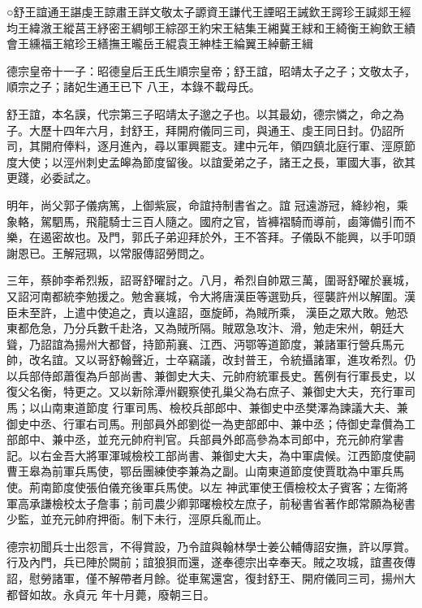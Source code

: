 
\begin{pinyinscope}

 ○舒王誼通王諶虔王諒肅王詳文敬太子謜資王謙代王諲昭王誡欽王諤珍王諴郯王經
 均王緯漵王縱莒王紓密王綢郇王綜邵王約宋王結集王緗冀王絿和王綺衡王絢欽王績會王纁福王綰珍王繕撫王曨岳王緄袁王紳桂王綸翼王綽蘄王緝



 德宗皇帝十一子：昭德皇后王氏生順宗皇帝；舒王誼，昭靖太子之子；文敬太子，順宗之子；諸妃生通王已下
 八王，本錄不載母氏。



 舒王誼，本名謨，代宗第三子昭靖太子邈之子也。以其最幼，德宗憐之，命之為子。大歷十四年六月，封舒王，拜開府儀同三司，與通王、虔王同日封。仍詔所司，其開府俸料，逐月進內，尋以軍興罷支。建中元年，領四鎮北庭行軍、涇原節度大使；以涇州刺史孟皞為節度留後。以誼愛弟之子，諸王之長，軍國大事，欲其更踐，必委試之。



 明年，尚父郭子儀病篤，上御紫宸，命誼持制書省之。誼
 冠遠游冠，絳紗袍，乘象輅，駕駟馬，飛龍騎士三百人隨之。國府之官，皆褲褶騎而導前，鹵簿備引而不樂，在遏密故也。及門，郭氏子弟迎拜於外，王不答拜。子儀臥不能興，以手叩頭謝恩已。王解冠珮，以常服傳詔勞問之。



 三年，蔡帥李希烈叛，詔哥舒曜討之。八月，希烈自帥眾三萬，圍哥舒曜於襄城，又詔河南都統李勉援之。勉舍襄城，令大將唐漢臣等選勁兵，徑襲許州以解圍。漢臣未至許，上遣中使追之，責以違詔，亟旋師，為賊所乘，
 漢臣之眾大敗。勉恐東都危急，乃分兵數千赴洛，又為賊所隔。賊眾急攻汴、滑，勉走宋州，朝廷大聳，乃詔誼為揚州大都督，持節荊襄、江西、沔鄂等道節度，兼諸軍行營兵馬元帥，改名誼。又以哥舒翰聲近，士卒竊議，改封普王，令統攝諸軍，進攻希烈。仍以兵部侍郎蕭復為戶部尚書、兼御史大夫、元帥府統軍長史。舊例有行軍長史，以復父名衡，特更之。又以新除潭州觀察使孔巢父為右庶子、兼御史大夫，充行軍司馬；以山南東道節度
 行軍司馬、檢校兵部郎中、兼御史中丞樊澤為諫議大夫、兼御史中丞、行軍右司馬。刑部員外郎劉從一為吏部郎中、兼中丞；侍御史韋儹為工部郎中、兼中丞，並充元帥府判官。兵部員外郎高參為本司郎中，充元帥府掌書記。以右金吾大將軍渾瑊檢校工部尚書、兼御史大夫，為中軍虞候。江西節度使嗣曹王皋為前軍兵馬使，鄂岳團練使李兼為之副。山南東道節度使賈耽為中軍兵馬使。荊南節度使張伯儀充後軍兵馬使。以左
 神武軍使王價檢校太子賓客；左衛將軍高承謙檢校太子詹事；前司農少卿郭曙檢校左庶子，前秘書省著作郎常願為秘書少監，並充元帥府押衙。制下未行，涇原兵亂而止。



 德宗初聞兵士出怨言，不得賞設，乃令誼與翰林學士姜公輔傳詔安撫，許以厚賞。行及內門，兵已陣於闕前；誼狼狽而還，遂奉德宗出幸奉天。賊之攻城，誼晝夜傳詔，慰勞諸軍，僅不解帶者月餘。從車駕還宮，復封舒王、開府儀同三司，揚州大都督如故。永貞元
 年十月薨，廢朝三日。




\end{pinyinscope}
